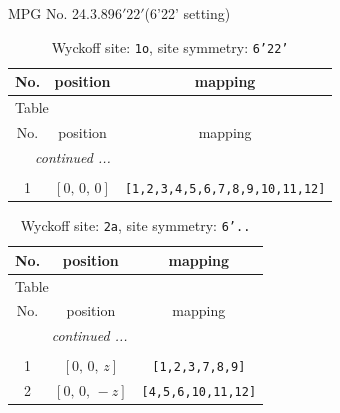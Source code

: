 \documentclass[fleqn,8pt]{jsarticle}
\begin{document}
\setcounter{MaxMatrixCols}{32}

\renewcommand{\tablename}{Table~}
\renewcommand{\figurename}{Figure~}
\begin{center}
\LARGE
MPG No. 24.3.89\quad$6'22'$\quad(6'22' setting)
\end{center}
\renewcommand{\arraystretch}{1.2}
\begin{longtable}{ccc}
\caption{Wyckoff site: {\tt 1o}, site symmetry: {\tt 6'22'}}
 \\
 \hline \hline
No. & position & mapping \\ \hline \endfirsthead

\multicolumn{2}{l}{\tablename\ \thetable{}} \\
 \hline \hline
No. & position & mapping \\ \hline \endhead

 \hline \hline
\multicolumn{2}{r}{\footnotesize\it continued ...} \\ \endfoot

 \hline \hline
\multicolumn{2}{r}{} \\ \endlastfoot

1 & $\left[ 0,\, 0,\, 0 \right]$ & {\tt [1,2,3,4,5,6,7,8,9,10,11,12]} \\
\end{longtable}
\renewcommand{\arraystretch}{1.2}
\begin{longtable}{ccc}
\caption{Wyckoff site: {\tt 2a}, site symmetry: {\tt 6'..}}
 \\
 \hline \hline
No. & position & mapping \\ \hline \endfirsthead

\multicolumn{2}{l}{\tablename\ \thetable{}} \\
 \hline \hline
No. & position & mapping \\ \hline \endhead

 \hline \hline
\multicolumn{2}{r}{\footnotesize\it continued ...} \\ \endfoot

 \hline \hline
\multicolumn{2}{r}{} \\ \endlastfoot

1 & $\left[ 0,\, 0,\, z \right]$ & {\tt [1,2,3,7,8,9]} \\ \hline
2 & $\left[ 0,\, 0,\, - z \right]$ & {\tt [4,5,6,10,11,12]} \\
\end{longtable}
\renewcommand{\arraystretch}{1.2}
\end{document}
